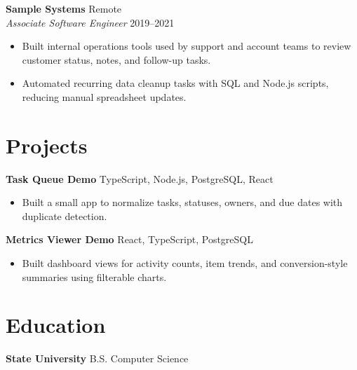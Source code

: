 \documentclass[10pt]{article}
\begin{document}
\textbf{Sample Systems} \hfill Remote \\
\textit{Associate Software Engineer} \hfill 2019--2021
\begin{itemize}
  \item Built internal operations tools used by support and account teams to review customer status, notes, and follow-up tasks.
  \item Automated recurring data cleanup tasks with SQL and Node.js scripts, reducing manual spreadsheet updates.
\end{itemize}

\section*{Projects}
\textbf{Task Queue Demo} \hfill TypeScript, Node.js, PostgreSQL, React
\begin{itemize}
  \item Built a small app to normalize tasks, statuses, owners, and due dates with duplicate detection.
\end{itemize}

\textbf{Metrics Viewer Demo} \hfill React, TypeScript, PostgreSQL
\begin{itemize}
  \item Built dashboard views for activity counts, item trends, and conversion-style summaries using filterable charts.
\end{itemize}

\section*{Education}
\textbf{State University} \hfill B.S. Computer Science
\end{document}
